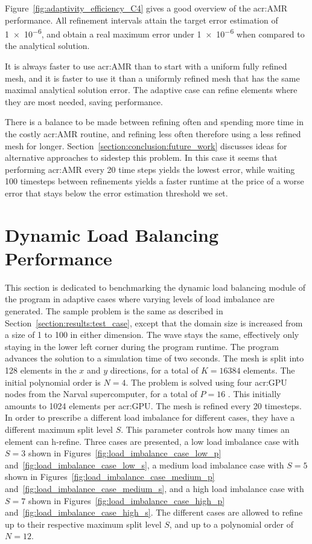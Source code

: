 Figure~\ref{fig:adaptivity_efficiency_C4} gives a good overview of the \acrshort{acr:AMR}
performance. All refinement intervals attain the target error estimation of \num{1e-6}, and obtain a
real maximum error under \num{1e-6} when compared to the analytical solution. 

It is always faster to use \acrshort{acr:AMR} than to start with a uniform fully refined mesh, and
it is faster to use it than a uniformly refined mesh that has the same maximal analytical solution
error. The adaptive case can refine elements where they are most needed, saving performance.

There is a balance to be made between refining often and spending more time in the costly
\acrshort{acr:AMR} routine, and refining less often therefore using a less refined mesh for longer.
Section~\ref{section:conclusion:future_work} discusses ideas for alternative approaches to sidestep
this problem. In this case it seems that performing \acrshort{acr:AMR} every 20 time steps yields
the lowest error, while waiting 100 timesteps between refinements yields a faster runtime at the
price of a worse error that stays below the error estimation threshold we set.

\section{Dynamic Load Balancing Performance}\label{section:results:load_balancing_performance}

This section is dedicated to benchmarking the dynamic load balancing module of the program in
adaptive cases where varying levels of load imbalance are generated. The sample problem is the same
as described in Section~\ref{section:results:test_case}, except that the domain size is increased
from a size of 1 to 100 in either dimension. The wave stays the same, effectively only staying in
the lower left corner during the program runtime. The program advances the solution to a simulation
time of two seconds. The mesh is split into 128 elements in the \(x\) and \(y\) directions, for a
total of \(K = 16384\) elements. The initial polynomial order is \(N = 4\). The problem is solved
using four \acrshort{acr:GPU} nodes from the Narval supercomputer, for a total of \(P = 16\)
. This initially amounts to 1024 elements per \acrshort{acr:GPU}. The mesh is
refined every 20 timesteps. In order to prescribe a different load imbalance for different cases,
they have a different maximum split level \(S\). This parameter controls how many times an element
can h-refine. Three cases are presented, a low load imbalance case with \(S = 3\) shown in
Figures~\ref{fig:load_imbalance_case_low_p} and~\ref{fig:load_imbalance_case_low_s}, a medium load
imbalance case with \(S = 5\) shown in Figures~\ref{fig:load_imbalance_case_medium_p}
and~\ref{fig:load_imbalance_case_medium_s}, and a high load imbalance case with \(S = 7\) shown in
Figures~\ref{fig:load_imbalance_case_high_p} and~\ref{fig:load_imbalance_case_high_s}. The different
cases are allowed to refine up to their respective maximum split level \(S\), and up to a polynomial
order of \(N = 12\). 

